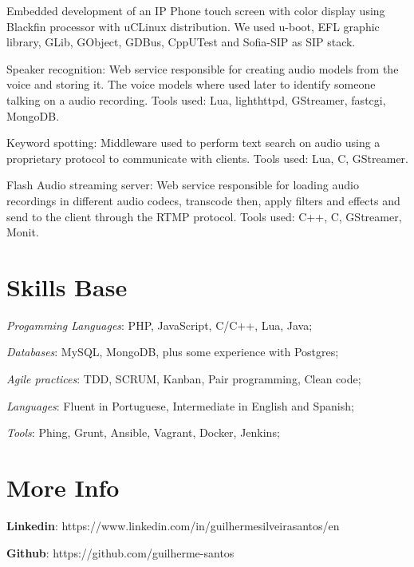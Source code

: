 \documentclass[margin]{res}
\begin{document}
\begin{resume}
Embedded development of an IP Phone touch screen with color display 
using Blackfin processor with uCLinux distribution. We used u-boot, EFL 
graphic library, GLib, GObject, GDBus, CppUTest and Sofia-SIP as SIP stack.

Speaker recognition: Web service responsible for creating audio models from the voice and storing it. The voice models where used later to identify someone talking on a audio recording. Tools used: Lua, lighthttpd, GStreamer, fastcgi, MongoDB.

Keyword spotting: Middleware used to perform text search on audio using a proprietary protocol to communicate with clients. Tools used: Lua, C, GStreamer.

Flash Audio streaming server: Web service responsible for loading audio recordings in different audio codecs, transcode then, apply filters and effects and send to the client through the RTMP protocol. Tools used: C++, C, GStreamer, Monit.

\section{Skills Base} \textit{Progamming Languages}: PHP, JavaScript, C/C++, Lua, Java;

	\textit{Databases}: MySQL, MongoDB, plus some experience with Postgres;
	
	\textit{Agile practices}: TDD, SCRUM, Kanban, Pair programming, Clean code;
	
	\textit{Languages}: Fluent in Portuguese, Intermediate in English and Spanish;
	
	\textit{Tools}: Phing, Grunt, Ansible, Vagrant, Docker, Jenkins;
 
\section{More Info} \textbf{Linkedin}: https://www.linkedin.com/in/guilhermesilveirasantos/en

    \textbf{Github}: https://github.com/guilherme-santos

\end{resume} 
\end{document}

